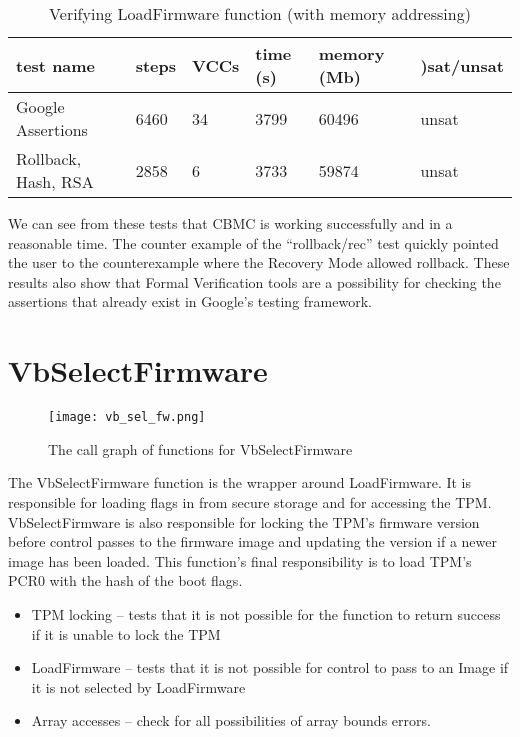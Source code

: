 \begin{table}[!htbp]
    \centering
    \caption{Verifying LoadFirmware function (with memory addressing)}\label{ldfw_results}
    \begin{tabular}{llllll}
        \toprule
        test name & steps & VCCs  & time (s) & memory (Mb) &)sat/unsat  \\ \bottomrule
        Google Assertions & 6460 & 34 & 3799 & 60496 & unsat \\
        Rollback, Hash, RSA & 2858 & 6 & 3733 & 59874 & unsat \\
    \end{tabular}
\end{table}
We can see from these tests that CBMC is working successfully and in a reasonable time.
The counter example of the ``rollback/rec'' test quickly pointed the user to the counterexample where the Recovery Mode allowed rollback.
These results also show that Formal Verification tools are a possibility for checking the assertions that already exist in Google's testing framework.

\section{VbSelectFirmware}

\begin{figure}[!htbp]
  \centering
  \texttt{[image: vb\_sel\_fw.png]}
  \caption[VbSelectFirmware Call Graph]{The call graph of functions for VbSelectFirmware}\label{fig:vbselfw}
\end{figure}

The VbSelectFirmware function is the wrapper around LoadFirmware.
It is responsible for loading flags in from secure storage and for accessing the TPM\@.
VbSelectFirmware is also responsible for locking the TPM's firmware version before control passes to the firmware image and updating the version if a newer image has been loaded.
This function's final responsibility is to load TPM's PCR0 with the hash of the boot flags.

\begin{itemize}
 \item  TPM locking -- tests that it is not possible for the function to return success if it is unable to lock the TPM
 \item  LoadFirmware -- tests that it is not possible for control to pass to an Image if it is not selected by LoadFirmware
 \item  Array accesses -- check for all possibilities of array bounds errors.
\end{itemize}

